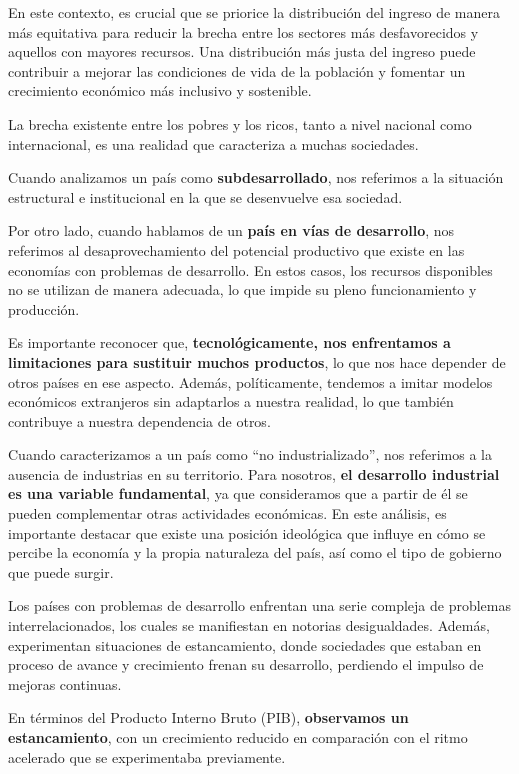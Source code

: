 \documentclass[
  jou,
  floatsintext,
  longtable,
  a4paper,
  nolmodern,
  notxfonts,
  notimes,
  12pt,
  colorlinks=true,linkcolor=blue,citecolor=blue,urlcolor=blue]{apa7}
\begin{document}
En este contexto, es crucial que se priorice la distribución del ingreso
de manera más equitativa para reducir la brecha entre los sectores más
desfavorecidos y aquellos con mayores recursos. Una distribución más
justa del ingreso puede contribuir a mejorar las condiciones de vida de
la población y fomentar un crecimiento económico más inclusivo y
sostenible.

La brecha existente entre los pobres y los ricos, tanto a nivel nacional
como internacional, es una realidad que caracteriza a muchas sociedades.

Cuando analizamos un país como \textbf{subdesarrollado}, nos referimos a
la situación estructural e institucional en la que se desenvuelve esa
sociedad.

Por otro lado, cuando hablamos de un \textbf{país en vías de
desarrollo}, nos referimos al desaprovechamiento del potencial
productivo que existe en las economías con problemas de desarrollo. En
estos casos, los recursos disponibles no se utilizan de manera adecuada,
lo que impide su pleno funcionamiento y producción.

Es importante reconocer que, \textbf{tecnológicamente, nos enfrentamos a
limitaciones para sustituir muchos productos}, lo que nos hace depender
de otros países en ese aspecto. Además, políticamente, tendemos a imitar
modelos económicos extranjeros sin adaptarlos a nuestra realidad, lo que
también contribuye a nuestra dependencia de otros.

Cuando caracterizamos a un país como ``no industrializado'', nos
referimos a la ausencia de industrias en su territorio. Para nosotros,
\textbf{el desarrollo industrial es una variable fundamental}, ya que
consideramos que a partir de él se pueden complementar otras actividades
económicas. En este análisis, es importante destacar que existe una
posición ideológica que influye en cómo se percibe la economía y la
propia naturaleza del país, así como el tipo de gobierno que puede
surgir.

Los países con problemas de desarrollo enfrentan una serie compleja de
problemas interrelacionados, los cuales se manifiestan en notorias
desigualdades. Además, experimentan situaciones de estancamiento, donde
sociedades que estaban en proceso de avance y crecimiento frenan su
desarrollo, perdiendo el impulso de mejoras continuas.

En términos del Producto Interno Bruto (PIB), \textbf{observamos un
estancamiento}, con un crecimiento reducido en comparación con el ritmo
acelerado que se experimentaba previamente.
\end{document}
